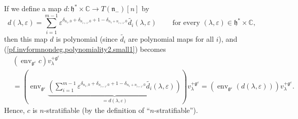\documentclass[etingof-lie.tex]{subfiles}
\begin{document}
If we define a map $d:\mathfrak{h}^{\ast}\times\mathbb{C}\rightarrow T\left(
\mathfrak{n}_{-}\right)  \left[  n\right]  $ by%
\[
d\left(  \lambda,\varepsilon\right)  =\sum\limits_{i=1}^{m-1}\varepsilon
^{\delta_{n_{1},0}+\delta_{n_{i+1},0}+1-\delta_{n_{1}+n_{i+1},0}%
}\widetilde{d_{i}}\left(  \lambda,\varepsilon\right)
\ \ \ \ \ \ \ \ \ \ \text{for every }\left(  \lambda,\varepsilon\right)
\in\mathfrak{h}^{\ast}\times\mathbb{C},
\]
then this map $d$ is polynomial (since $\widetilde{d_{i}}$ are polynomial maps
for all $i$), and (\ref{pf.invformnondeg.polynomiality2.small1}) becomes%
\begin{align*}
&  \left(  \operatorname*{env}\nolimits_{\mathfrak{g}^{\varepsilon}}c\right)
v_{\lambda}^{+\mathfrak{g}^{\varepsilon}}\\
&  =\left(  \operatorname*{env}\nolimits_{\mathfrak{g}^{\varepsilon}%
}\underbrace{\left(  \sum\limits_{i=1}^{m-1}\varepsilon^{\delta_{n_{1}%
,0}+\delta_{n_{i+1},0}+1-\delta_{n_{1}+n_{i+1},0}}\widetilde{d_{i}}\left(
\lambda,\varepsilon\right)  \right)  }_{=d\left(  \lambda,\varepsilon\right)
}\right)  v_{\lambda}^{+\mathfrak{g}^{\varepsilon}}=\left(
\operatorname*{env}\nolimits_{\mathfrak{g}^{\varepsilon}}\left(  d\left(
\lambda,\varepsilon\right)  \right)  \right)  v_{\lambda}^{+\mathfrak{g}%
^{\varepsilon}}.
\end{align*}
Hence, $c$ is $n$-stratifiable (by the definition of ``$n$-stratifiable'').
\end{document}
